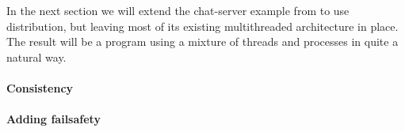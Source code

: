 In the next section we will extend the chat-server example from
 to use distribution, but leaving most of its existing
multithreaded architecture in place.  The result will be a program
using a mixture of threads and processes in quite a natural way.





\paragraph{Consistency}


\paragraph{Adding failsafety}




